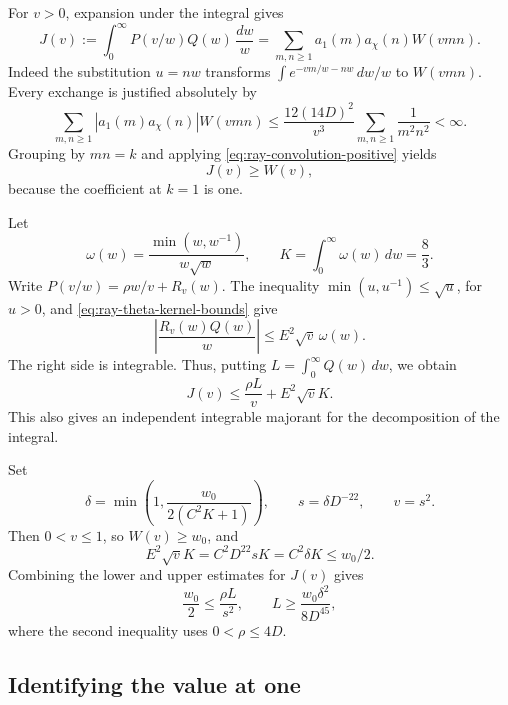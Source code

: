 For \(v>0\), expansion under the integral gives
\begin{equation}
 \label{eq:ray-kernel-product}
 J(v):=\int_0^\infty P(v/w)Q(w)\,\frac{dw}{w}
           =\sum_{m,n\geq1}a_1(m)a_\chi(n)W(vmn).
\end{equation}
Indeed the substitution \(u=nw\) transforms
\(\int e^{-vm/w-nw}\,dw/w\) to \(W(vmn)\).
Every exchange is justified absolutely by
\[
 \sum_{m,n\geq1}|a_1(m)a_\chi(n)|W(vmn)
       \leq\frac{12(14D)^2}{v^3}
                              \sum_{m,n\geq1}\frac1{m^2n^2}<\infty .
\]
Grouping by \(mn=k\) and applying
\eqref{eq:ray-convolution-positive} yields
\[
                         J(v)\geq W(v),
\]
because the coefficient at \(k=1\) is one.

Let
\[
       \omega(w)=\frac{\min(w,w^{-1})}{w\sqrt w},\qquad
       K=\int_0^\infty\omega(w)\,dw=\frac83 .
\]
Write \(P(v/w)=\rho w/v+R_v(w)\).
The inequality \(\min(u,u^{-1})\leq\sqrt u\), for \(u>0\),
and \eqref{eq:ray-theta-kernel-bounds} give
\[
       \left|\frac{R_v(w)Q(w)}w\right|
                         \leq E^2\sqrt v\,\omega(w).
\]
The right side is integrable. Thus, putting
\(L=\int_0^\infty Q(w)\,dw\), we obtain
\begin{equation}
 \label{eq:ray-upper-kernel}
                  J(v)\leq\frac{\rho L}{v}+E^2\sqrt v K .
\end{equation}
This also gives an independent integrable majorant for the
decomposition of the integral.

Set
\[
 \delta=\min\left(1,\frac{w_0}{2(C^2K+1)}\right),\qquad
                         s=\delta D^{-22},\qquad v=s^2 .
\]
Then \(0<v\leq1\), so \(W(v)\geq w_0\), and
\[
            E^2\sqrt v K=C^2D^{22}sK=C^2\delta K\leq w_0/2 .
\]
Combining the lower and upper estimates for \(J(v)\) gives
\[
                \frac{w_0}{2}\leq\frac{\rho L}{s^2},
                    \qquad
                L\geq\frac{w_0\delta^2}{8D^{45}},
\]
where the second inequality uses \(0<\rho\leq4D\).

\subsection{Identifying the value at one}

